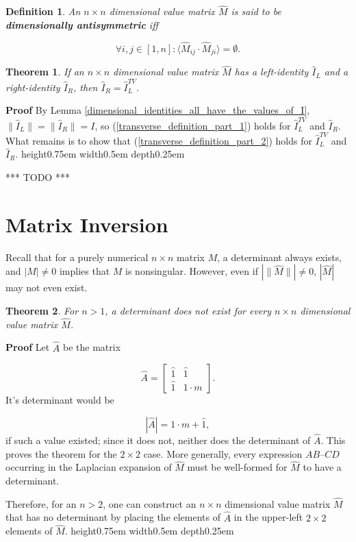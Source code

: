 \documentclass[10pt,letterpaper]{article}
\newtheorem{defn}{Definition}[section]
\newtheorem{thm}{Theorem}[section]
\newenvironment{proof}{\noindent\textbf{Proof} }{\qed \newline}
\newcommand{\qed}{\nobreak \ifvmode \relax \else
      \ifdim\lastskip<1.5em \hskip-\lastskip
      \hskip1.5em plus0em minus0.5em \fi \nobreak
      \vrule height0.75em width0.5em depth0.25em\fi}
\numberwithin{equation}{section}
\begin{document}
\begin{defn}An $n \times n$ dimensional value matrix $\hat M$ is said
  to be \textbf{dimensionally antisymmetric} iff

  \[ \forall i,j \in [1, n] : \langle \hat M_{ij} \cdot \hat M_{ji}
  \rangle = \emptyset . \] \end{defn}

\begin{thm}If an $n \times n$ dimensional value matrix $\hat M$ has a
  left-identity $\hat I_L$ and a right-identity $\hat I_R$, then $\hat
  I_R = \hat I^{TV}_L$. \end{thm}

\begin{proof}By Lemma
  \ref{dimensional_identities_all_have_the_values_of_I}, $\| \hat I_L
  \| = \| \hat I_R \| = I$, so (\ref{transverse_definition_part_1})
  holds for $\hat I^{TV}_L$ and $\hat I_R$.  What remains is to show
  that (\ref{transverse_definition_part_2}) holds for $\hat I^{TV}_L$
  and $\hat I_R$. \end{proof}

*** TODO ***

\section{Matrix Inversion}

Recall that for a purely numerical $n \times n$ matrix $M$, a
determinant always exists, and $|M| \not= 0$ implies that $M$ is
nonsingular.  However, even if $| \| \hat M \| | \not= 0$, $| \hat M
|$ may not even exist.

\begin{thm}For $n > 1$, a determinant does not exist for every $n
  \times n$ dimensional value matrix $\hat M$. \end{thm}

\begin{proof}Let $\hat A$ be the matrix

\[ \hat A = \left[ \begin{matrix}
 \hat 1 & \hat 1 \\
 \hat 1 & 1 \cdot m
 \end{matrix} \right] . \] It's determinant would be

\[ | \hat A | = 1 \cdot m + \hat 1 , \] if such a value existed; since
it does not, neither does the determinant of $\hat A$.  This proves
the theorem for the $2 \times 2$ case.  More generally, every
expression $AB – CD$ occurring in the Laplacian expansion of $\hat M$
must be well-formed for $\hat M$ to have a determinant.

Therefore, for an $n > 2$, one can construct an $n \times n$
dimensional value matrix $\hat M$ that has no determinant by placing
the elements of $\hat A$ in the upper-left $2 \times 2$ elements of
$\hat M$. \end{proof}
\end{document}
